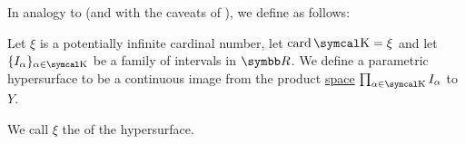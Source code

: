 \begin{definition}\label{def:parametric_hypersurface}
  In analogy to  (and with the caveats of ), we define  as follows:

  Let \( \xi \) is a potentially infinite cardinal number, let \( \Card \CK = \xi \) and let \( \{ I_\alpha \}_{\alpha \in \CK} \) be a family of intervals in \( \BR \). We define a parametric hypersurface to be a continuous image from the product \hyperref[def:topological_product]{space} \( \prod_{\alpha \in \CK} I_\alpha \) to \( Y \).

  We call \( \xi \) the  of the hypersurface.
\end{definition}
